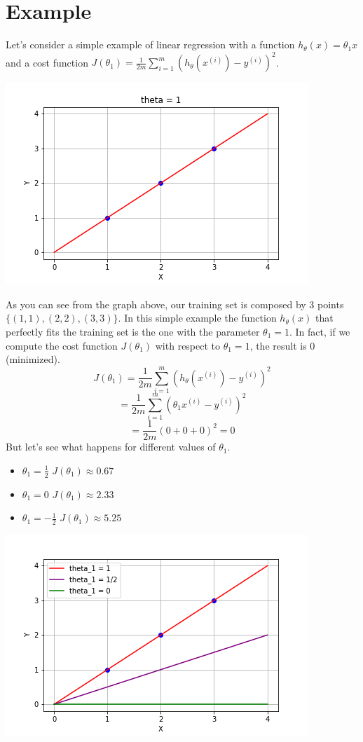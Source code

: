 \section{Example}
Let's consider a simple example of linear regression with a function $h_{\theta}(x) = \theta_{1}x$ and a cost function $J(\theta_{1}) = \frac{1}{2m}\sum_{i = 1}^{m}(h_{\theta}(x^{(i)}) - y^{(i)})^{2}$.
\begin{center}
    \includegraphics[scale = 0.7]{images/Simple liner reg.png}
\end{center}
As you can see from the graph above, our training set is composed by 3 points $\{(1,1), (2,2), (3,3)\}$. In this simple example the function $h_{\theta}(x)$ that perfectly fits the training set is the one with the parameter $\theta_{1} = 1$. In fact, if we compute the cost function $J(\theta_{1})$ with respect to $\theta_{1} = 1$, the result is 0 (minimized).
\[J(\theta_{1}) = \frac{1}{2m}\sum_{i = 1}^{m}(h_{\theta}(x^{(i)}) - y^{(i)})^{2}\]
\[= \frac{1}{2m}\sum_{i = 1}^{m}(\theta_{1}x^{(i)} - y^{(i)})^{2}\]
\[= \frac{1}{2m}(0+0+0)^2 = 0\]
But let's see what happens for different values of $\theta_{1}$.
\begin{itemize}
    \item $\theta_{1} = \frac{1}{2}$ $J(\theta_{1}) \approx 0.67$
    \item $\theta_{1} = 0$ $J(\theta_{1}) \approx 2.33$
    \item $\theta_{1} = -\frac{1}{2}$ $J(\theta_{1}) \approx 5.25$
\end{itemize}
\begin{center}
    \includegraphics[scale = 0.7]{images/Simple liner reg (colors).png}
\end{center}
